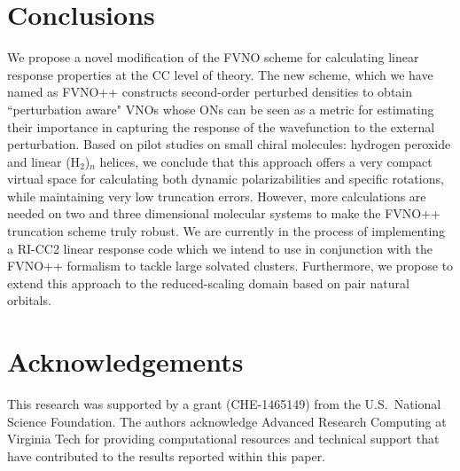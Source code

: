 \section{Conclusions}

We propose a novel modification of the FVNO scheme for calculating linear
response properties at the CC level of theory. The new scheme, which we have named as FVNO++ constructs second-order perturbed densities to obtain ``perturbation aware" VNOs whose ONs can be seen as a metric for estimating 
their importance in capturing the response of the wavefunction to the external 
perturbation. Based on pilot studies on small chiral molecules: hydrogen peroxide and linear (H$_2$)$_n$ helices, we conclude that this approach offers a very compact virtual space for calculating both dynamic polarizabilities and specific rotations, while maintaining very low truncation errors. However, more calculations are needed on two and three dimensional molecular systems to make the FVNO++ truncation scheme truly robust. We are currently in the process of implementing a RI-CC2 linear response code\cite{Friese12} which we intend to use in conjunction with the FVNO++ formalism to tackle large solvated clusters. Furthermore, we propose to extend this approach to the reduced-scaling domain based on pair natural orbitals\cite{NeeseCCSD09,Neese09}.

\section{Acknowledgements}

This research was supported by a grant (CHE-1465149) from the U.S.\
National Science Foundation. The authors acknowledge Advanced Research
Computing at Virginia Tech for providing computational resources and
technical support that have contributed to the results reported within this
paper.

\clearpage
%


\newpage


